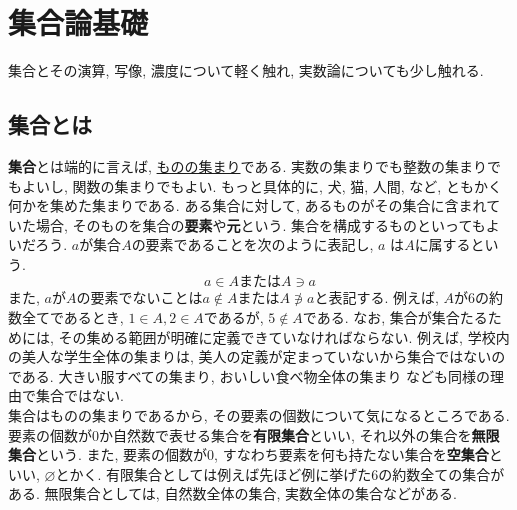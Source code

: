 \documentclass[a4j,dvipdfmx]{jsarticle}
\numberwithin{equation}{section}
\begin{document}
    \section{集合論基礎}
        集合とその演算, 写像, 濃度について軽く触れ, 実数論についても少し触れる.
        \subsection{集合とは}
            \textbf{集合}とは端的に言えば, \underline{ものの集まり}である. 実数の集まりでも整数の集まりでもよいし, 関数の集まりでもよい.
            もっと具体的に, 犬, 猫, 人間, など, ともかく何かを集めた集まりである. ある集合に対して, あるものがその集合に含まれていた場合, 
            そのものを集合の\textbf{要素}や\textbf{元}という. 集合を構成するものといってもよいだろう. $a$が集合$A$の要素であることを次のように表記し, $a$
            は$A$に属するという.
            \begin{equation}
                a \in A \text{または} A \ni a \label{eq:集合論基礎:元の表記}
            \end{equation}
            また, $a$が$A$の要素でないことは$a\not\in A$または$A \not\ni a$と表記する. 例えば, $A$が6の約数全てであるとき, 
            $1\in A,2\in A$であるが, $5\not\in A$である. なお, 集合が集合たるためには, その集める範囲が明確に定義できていなければならない.
            例えば, 学校内の美人な学生全体の集まりは, 美人の定義が定まっていないから集合ではないのである. 大きい服すべての集まり, おいしい食べ物全体の集まり
            なども同様の理由で集合ではない. \\
        
            集合はものの集まりであるから, その要素の個数について気になるところである. 要素の個数が0か自然数で表せる集合を\textbf{有限集合}といい, 
            それ以外の集合を\textbf{無限集合}という. また, 要素の個数が0, すなわち要素を何も持たない集合を\textbf{空集合}といい, $\varnothing$とかく.
            有限集合としては例えば先ほど例に挙げた6の約数全ての集合がある. 無限集合としては, 自然数全体の集合, 実数全体の集合などがある.
\end{document}
